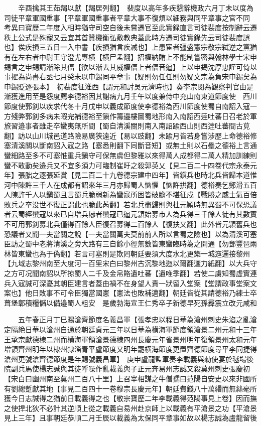 　　辛酉擒其王茹羯以獻【羯居列翻】　裴度以高年多疾懇辭機政六月丁未以度為司徒平章軍國重事【平章軍國重事者平章大事不復煩以細務與同平章事之官不同　考異曰寶歷二年度入相時猶守司空自後未嘗遷官至此實録直言司徒裴度按制辭云遷秩上公式是殊寵又云宜其首贊機衡弘敷教典蓋此時方遷司徒實錄先云司徒裴度誤也】俟疾損三五日一入中書【疾損猶言疾减也】上患宦者彊盛憲宗敬宗弑逆之黨猶有在左右者中尉王守澄尤專横【横尸孟翻】招權納賄上不能制嘗密與翰林學士宋申錫言之申錫請漸除其偪【欲以漸去其威權偪上者偪音逼】上以申錫沈厚忠謹可倚以事擢為尚書右丞七月癸未以申錫同平章事【疑則勿任任則勿疑文宗為負宋申錫矣為申錫貶逐張本】　初裴度征淮西【謂元和討吳元濟時也】奏李宗閔為觀察判官由是漸獲進用至是怨度薦李德裕因其謝病九月壬午以度兼侍中充山南東道節度使　西川節度使郭釗以疾求代冬十月戊申以義成節度使李德裕為西川節度使蜀自南詔入寇一方殘弊郭釗多病未暇完補德裕至鎭作籌邉樓圖蜀地形南入南詔西逹吐蕃日召老於軍旅習邉事者雖走卒蠻夷無所間【蜀自清溪關則南入南詔踰西山則西逹吐蕃間古莧翻】訪以山川城邑道路險易廣狹遠近【易以豉翻】未踰月皆若身嘗涉歷上命德裕修塞清溪關以斷南詔入寇之路【塞悉則翻下同斷音短】或無土則以石壘之德裕上言通蠻細路至多不可塞惟重兵鎭守可保無虞但黎雅以來得萬人成都得二萬人精加訓練則蠻不敢動矣邉兵又不宜多須力可臨制崔旴之殺郭英乂【見二百二十四卷代宗永泰元年】張朏之逐張延賞【見二百二十九卷德宗建中四年】皆鎭兵也時北兵皆歸本道惟河中陳許三千人在成都有詔來年三月亦歸蜀人忷懼【忷許拱翻】德裕奏乞鄭滑五百人陳許千人以鎭蜀且言蜀兵脆弱新為蠻寇所困皆破膽不堪征戍【戰勝之威士氣百倍敗兵之卒没世不復正謂此也脆此芮翻】若北兵盡歸則與杜元頴時無異蜀不可保恐議者云蜀經蠻寇以來已自增兵曏者蠻寇已逼元頴始募市人為兵得三千餘人徒有其數實不可用郭釗募北兵僅得百餘人臣復召募得二百餘人【復扶又翻】此外皆元頴舊兵也恐議者又聞一夫當關之說【一夫當關萬夫莫前前人所以言蜀之險也】以為清溪可塞臣訪之蜀中老將清溪之旁大路有三自餘小徑無數皆東蠻臨時為之開通【勿鄧豐琶兩林皆東蠻也為于偽翻】若言可塞則是欺罔朝廷要須大度水北更築一城迤邐接黎州【九域志黎州南至大度河一百里宋白曰黎州古沉黎地迤以爾翻邐力紙翻】以大兵守之方可况聞南詔以所掠蜀人二千及金帛賂遺吐蕃【遺唯季翻】若使二虜知蜀虚實連兵入寇誠可深憂其朝臣建言者蓋由禍不在身望人責一狀留入堂案【堂謂政事堂案文案也】他日敗事不可令臣獨當國憲【憲法也敗補邁翻】朝廷皆從其請德裕乃練士卒葺堡鄣積糧儲以備邉蜀人粗安　是歲勃海宣王仁秀卒子新德早死孫彛震立改元咸和

　　五年春正月丁巳賜滄齊節度名義昌軍【張孝忠以程日華為滄州刺史朱淊之亂滄定隔絶日華以滄州自通於朝廷貞元三年以日華為横海軍節度領滄景二州元和十三年王承宗獻德棣二州而横海軍領滄景德棣四州長慶元年省景州明年復領景州太和元年增領齊州明年以棣州隸淄青平盧節度又明年罷横海節度更置齊德節度尋平李同捷得滄州更號滄齊德節度是年賜號義昌軍】　庚申盧龍監軍奏李載義與勑使宴於毬場後院副兵馬使楊志誠與其徒呼噪作亂載義與子正元奔易州志誠又殺莫州刺史張慶初【宋白曰幽州南至莫州二百八十里】上召宰相謀之牛僧孺曰范陽自安史以來非國所有劉總蹔獻其地【事見二百四十一卷穆宗長慶元年】朝廷費錢八十萬緡而無絲毫所獲今日志誠得之猶前日載義得之也【敬宗寶歷二年李載義得范陽事見上卷】因而撫之使捍北狄不必計其逆順上從之載義自易州赴京師上以載義有平滄景之功【平滄景見上三年】且事朝廷恭順二月壬辰以載義為太保同平章事如故以楊志誠為盧龍留後

